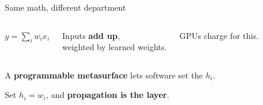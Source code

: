 \begin{frame}{Same math, different department}
\begin{columns}[T,onlytextwidth]
      \vspace{0.6em}
      {\Large \(y = \sum_i w_i x_i\)}

      \vspace{0.5em}
      \normalsize
      Inputs \textbf{add up},\\weighted by learned weights.

      \vspace{0.4em}
      \small GPUs charge for this.
  \end{columns}

  \vspace{0.4em}
  \centering
  \normalsize
  A \textbf{programmable metasurface} lets software set the \(h_i\).

  \vspace{0.3em}
  Set \(h_i = w_i\), and \textbf{propagation is the layer}.

\end{frame}

